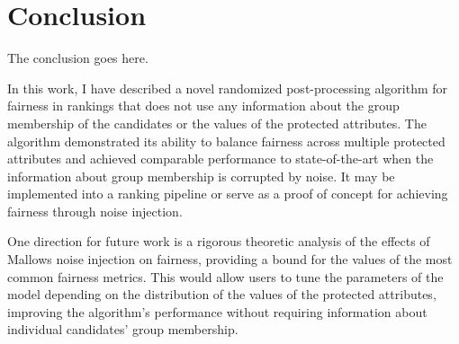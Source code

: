\chapter{Conclusion}
\label{conclusion}
The conclusion goes here.

In this work, I have described a novel randomized post-processing algorithm for fairness in rankings that does not use any information about the group membership of the candidates or the values of the protected attributes. The algorithm demonstrated its ability to balance fairness across multiple protected attributes and achieved comparable performance to state-of-the-art when the information about group membership is corrupted by noise. It may be implemented into a ranking pipeline or serve as a proof of concept for achieving fairness through noise injection.

One direction for future work is a rigorous theoretic analysis of the effects of Mallows noise injection on fairness, providing a bound for the values of the most common fairness metrics. This would allow users to tune the parameters of the model depending on the distribution of the values of the protected attributes, improving the algorithm's performance without requiring information about individual candidates' group membership.